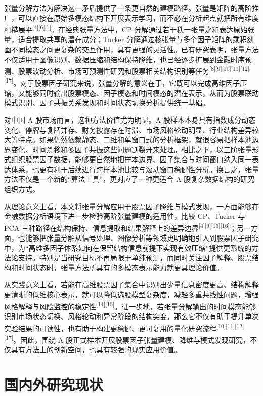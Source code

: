 张量分解方法为解决这一矛盾提供了一条更自然的建模路径。张量是矩阵的高阶推广，可以直接在原始多模态结构下开展表示学习，而不必在分析起点就把所有维度粗糙展平\textsuperscript{[4][6][7]}。在经典张量方法中，CP 分解通过若干秩一张量之和表达原始张量，适合提取共享的潜在成分；Tucker 分解通过核张量与多个因子矩阵的乘积刻画不同模态之间更复杂的交互作用，具有更强的灵活性。已有研究表明，张量方法不仅适用于图像识别、数据压缩和结构保持降维，也已经逐步扩展到金融时序预测、股票波动分析、市场可预测性研究和股票相关结构识别等任务\textsuperscript{[8][9][10][11][12][17]}。对于股票因子研究来说，张量分解的意义在于，它既可以完成高维因子压缩，又能够同时输出股票模态、因子模态和时间模态的潜在表示，从而为股票联动模式识别、因子共振关系发现和时间状态切换分析提供统一基础。

对中国 A 股市场而言，这种方法价值尤为明显。A 股样本本身具有指数成分动态变化、停牌与复牌并存、财务披露存在时滞、市场风格轮动明显、行业结构差异较大等特点。如果仍然依赖静态、二维和单窗口式的分析框架，就很容易把样本池边界变化、时间漂移和多因子共振这些问题割裂开来处理。相比之下，以三阶张量形式组织股票因子数据，能够更自然地把样本边界、因子集合与时间窗口纳入同一表达体系，也更有利于后续进行跨样本池比较与滚动窗口稳健性分析。换言之，张量方法不仅是一个新的“算法工具”，更对应了一种更适合 A 股复杂数据结构的研究组织方式。

从理论意义上看，本文将张量分解应用于股票因子降维与模式发现，一方面能够在金融数据分析语境下进一步检验高阶张量建模的适用性，比较 CP、Tucker 与 PCA 三种路径在结构保持、信息提取和结果解释上的差异边界\textsuperscript{[4][9][15][16]}；另一方面，也能够把张量分解从信号处理、图像分析等领域更明确地引入到股票因子研究中，为“高维多因子体系如何在保留结构信息前提下实现有效压缩”提供更系统的方法论支持。特别是当研究目标不再局限于单纯预测，而同时关注因子解释、股票结构和时间状态时，张量方法所具有的多模态表示能力就更具理论价值。

从实践意义上看，若能在高维股票因子集合中识别出少量信息密度更高、结构解释更清晰的低维核心表示，就可以降低选股模型复杂度，减轻多重共线性问题，增强风格解释与风险监控的稳定性\textsuperscript{[14][15]}。进一步地，若张量分解输出的时间模态能够识别市场状态切换、风格轮动和异常阶段的结构突变，那么它不仅有助于提升单次实验结果的可读性，也有助于构建更稳健、更可复用的量化研究流程\textsuperscript{[10][11][12][17]}。因此，围绕 A 股正式样本开展股票因子张量建模、降维与模式发现研究，不仅具有方法上的创新空间，也具有较强的现实应用价值。

\section{国内外研究现状}

